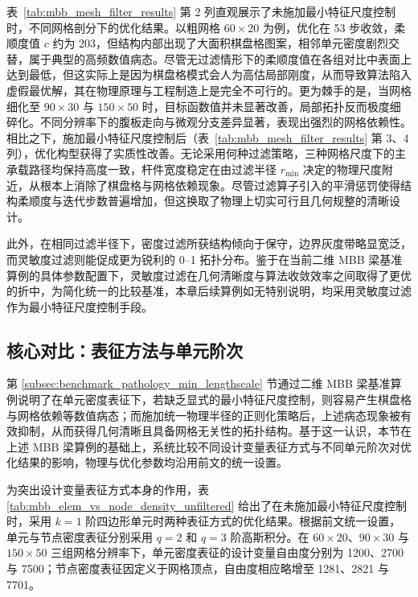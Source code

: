 表~\ref{tab:mbb_mesh_filter_results} 第 2 列直观展示了未施加最小特征尺度控制时，不同网格剖分下的优化结果。以粗网格 $60\times20$ 为例，优化在 53 步收敛，柔顺度值 $c$ 约为 203，但结构内部出现了大面积棋盘格图案，相邻单元密度剧烈交替，属于典型的高频数值病态。尽管无过滤情形下的柔顺度值在各组对比中表面上达到最低，但这实际上是因为棋盘格模式会人为高估局部刚度，从而导致算法陷入虚假最优解，其在物理原理与工程制造上是完全不可行的。更为棘手的是，当网格细化至 $90\times30$ 与 $150\times50$ 时，目标函数值并未显著改善，局部拓扑反而极度细碎化。不同分辨率下的腹板走向与微观分支差异显著，表现出强烈的网格依赖性。相比之下，施加最小特征尺度控制后（表~\ref{tab:mbb_mesh_filter_results} 第 3、4 列），优化构型获得了实质性改善。无论采用何种过滤策略，三种网格尺度下的主承载路径均保持高度一致，杆件宽度稳定在由过滤半径 $r_{\min}$ 决定的物理尺度附近，从根本上消除了棋盘格与网格依赖现象。尽管过滤算子引入的平滑惩罚使得结构柔顺度与迭代步数普遍增加，但这换取了物理上切实可行且几何规整的清晰设计。

此外，在相同过滤半径下，密度过滤所获结构倾向于保守，边界灰度带略显宽泛，而灵敏度过滤则能促成更为锐利的 0–1 拓扑分布。鉴于在当前二维 MBB 梁基准算例的具体参数配置下，灵敏度过滤在几何清晰度与算法收敛效率之间取得了更优的折中，为简化统一的比较基准，本章后续算例如无特别说明，均采用灵敏度过滤作为最小特征尺度控制手段。


\subsection{核心对比：表征方法与单元阶次}
\label{subsec:core_compare_rep_order}

第 \ref{subsec:benchmark_pathology_min_lengthscale} 节通过二维 MBB 梁基准算例说明了在单元密度表征下，若缺乏显式的最小特征尺度控制，则容易产生棋盘格与网格依赖等数值病态；而施加统一物理半径的正则化策略后，上述病态现象被有效抑制，从而获得几何清晰且具备网格无关性的拓扑结构。基于这一认识，本节在上述 MBB 梁算例的基础上，系统比较不同设计变量表征方式与不同单元阶次对优化结果的影响，物理与优化参数均沿用前文的统一设置。

为突出设计变量表征方式本身的作用，表 \ref{tab:mbb_elem_vs_node_density_unfiltered} 给出了在未施加最小特征尺度控制时，采用 $k=1$ 阶四边形单元时两种表征方式的优化结果。根据前文统一设置，单元与节点密度表征分别采用 $q=2$ 和 $q=3$ 阶高斯积分。在 $60 \times 20$、$90 \times 30$ 与 $150 \times 50$ 三组网格分辨率下，单元密度表征的设计变量自由度分别为 1200、2700 与 7500；节点密度表征因定义于网格顶点，自由度相应略增至 1281、2821 与 7701。

